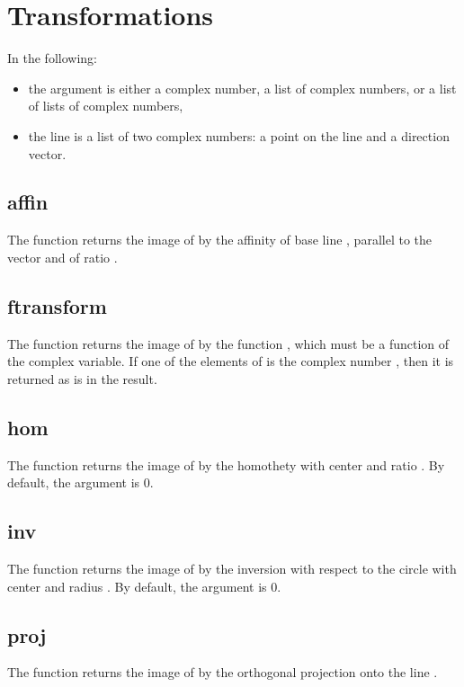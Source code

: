 \section{Transformations}
In the following:
\begin{itemize}
    \item the argument  is either a complex number, a list of complex numbers, or a list of lists of complex numbers,
    \item the line  is a list of two complex numbers: a point on the line and a direction vector.
\end{itemize}

\subsection{affin}
The function  returns the image of  by the affinity of base line , parallel to the vector  and of ratio .

\subsection{ftransform}
The function  returns the image of  by the function , which must be a function of the complex variable. If one of the elements of  is the complex number , then it is returned as is in the result.

\subsection{hom}
The function  returns the image of  by the homothety with center  and ratio . By default, the argument  is $0$.

\subsection{inv}
The function  returns the image of  by the inversion with respect to the circle with center  and radius . By default, the argument  is $0$.

\subsection{proj}
The function  returns the image of  by the orthogonal projection onto the line .

